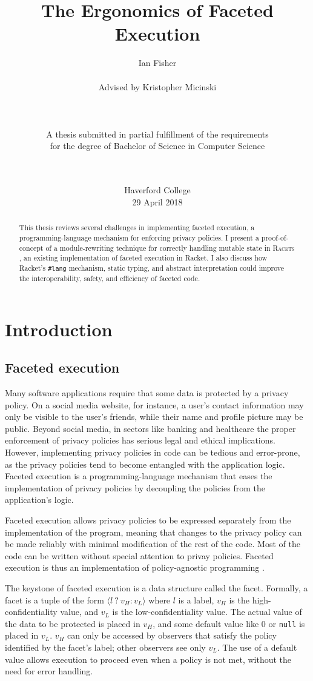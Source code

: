 \documentclass{article}
\title{The Ergonomics of Faceted Execution}
\author{Ian Fisher \\ \\ Advised by Kristopher Micinski \\ \\ \\ \\ A thesis submitted in partial fulfillment of the requirements \\ for the degree of Bachelor of Science in Computer Science \\ \\ \\}
\date{Haverford College \\ 29 April 2018}
\begin{document}
\maketitle

\begin{abstract}
	This thesis reviews several challenges in implementing faceted execution, a programming-language mechanism for enforcing privacy policies. I present a proof-of-concept of a module-rewriting technique for correctly handling mutable state in \textsc{Racets} \cite{racets}, an existing implementation of faceted execution in Racket. I also discuss how Racket's \texttt{\#lang} mechanism, static typing, and abstract interpretation could improve the interoperability, safety, and efficiency of faceted code.
\end{abstract}

\newpage
\tableofcontents
\newpage



\section{Introduction\label{sec:intro}}
\subsection{Faceted execution\label{sec:facets}}
Many software applications require that some data is protected by a privacy policy. On a social media website, for instance, a user's contact information may only be visible to the user's friends, while their name and profile picture may be public. Beyond social media, in sectors like banking and healthcare the proper enforcement of privacy policies has serious legal and ethical implications. However, implementing privacy policies in code can be tedious and error-prone, as the privacy policies tend to become entangled with the application logic. Faceted execution is a programming-language mechanism that eases the implementation of privacy policies by decoupling the policies from the application's logic.

Faceted execution allows privacy policies to be expressed separately from the implementation of the program, meaning that changes to the privacy policy can be made reliably with minimal modification of the rest of the code. Most of the code can be written without special attention to privay policies. Faceted execution is thus an implementation of policy-agnostic programming \cite{faceted}.

The keystone of faceted execution is a data structure called the facet. Formally, a facet is a tuple of the form $\langle l\ ?\ v_H : v_L \rangle$ where $l$ is a label, $v_H$ is the high-confidentiality value, and $v_L$ is the low-confidentiality value. The actual value of the data to be protected is placed in $v_H$, and some default value like $0$ or \texttt{null} is placed in $v_L$. $v_H$ can only be accessed by observers that satisfy the policy identified by the facet's label; other observers see only $v_L$. The use of a default value allows execution to proceed even when a policy is not met, without the need for error handling.
\end{document}
